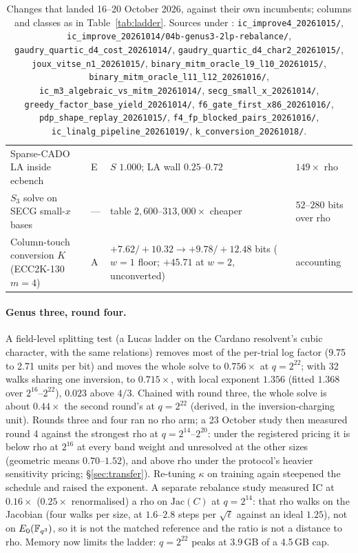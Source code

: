 \begin{table}[p]
\begin{tabularx}{\linewidth}{@{}>{\raggedright}Xl>{\raggedright}p{3.6cm}>{\raggedright\arraybackslash}p{3.2cm}@{}}
Sparse-CADO LA inside ecbench & E & $S$ $1.000$; LA wall $0.25$--$0.72$ & $149\times$ rho \\
$S_3$ solve on SECG small-$x$ bases & --- & table $2{,}600$--$313{,}000\times$ cheaper & $52$--$280$ bits over rho \\
Column-touch conversion $K$ (ECC2K-130 $m=4$) & A & $+7.62/+10.32\to+9.78/+12.48$ bits ($w=1$ floor; $+45.71$ at $w=2$, unconverted) & accounting \\
\bottomrule
\end{tabularx}
\caption[]{Changes that landed 16--20 October 2026, against their own
incumbents; columns and classes as in Table~\ref{tab:ladder}. Sources under
: \texttt{ic\_improve4\_20261015/},
\texttt{ic\_improve\_20261014/04b-genus3-2lp-rebalance/},
\texttt{gaudry\_quartic\_d4\_cost\_20261014/},
\texttt{gaudry\_quartic\_d4\_char2\_20261015/},
\texttt{joux\_vitse\_n1\_20261015/}, \texttt{binary\_mitm\_oracle\_l9\_l10\_20261015/},
\texttt{binary\_mitm\_oracle\_l11\_l12\_20261016/},
\texttt{ic\_m3\_algebraic\_vs\_mitm\_20261014/}, \texttt{secg\_small\_x\_20261014/},
\texttt{greedy\_factor\_base\_yield\_20261014/}, \texttt{f6\_gate\_first\_x86\_20261016/},
\texttt{pdp\_shape\_replay\_20261015/}, \texttt{f4\_fp\_blocked\_pairs\_20261016/},
\texttt{ic\_linalg\_pipeline\_20261019/}, \texttt{k\_conversion\_20261018/}.}
\label{tab:ladder2}
\end{table}

\paragraph{Genus three, round four.} A field-level splitting test (a Lucas
ladder on the Cardano resolvent's cubic character, with the same relations)
removes most of the per-trial log factor (9.75 to 2.71 units per bit) and
moves the whole solve to $0.756\times$ at $q=2^{22}$; with 32 walks sharing
one inversion, to $0.715\times$, with local exponent $1.356$ (fitted
$1.368$ over $2^{16}$--$2^{22}$), $0.023$ above $4/3$. Chained with round
three, the whole solve is about $0.44\times$ the second round's at
$q=2^{22}$ (derived, in the inversion-charging unit). Rounds three and four
ran no rho arm; a 23 October study then measured round 4 against the
strongest rho at $q=2^{14}$--$2^{20}$: under the registered pricing it is
below rho at $2^{16}$ at every band weight and unresolved at the other
sizes (geometric means $0.70$--$1.52$), and above rho under the protocol's
heavier sensitivity pricing; \S\ref{sec:transfer}). Re-tuning $\kappa$ on training again steepened the schedule
and raised the exponent. A separate rebalance study measured IC at
$0.16\times$ ($0.25\times$ renormalised) a rho on $\mathrm{Jac}(C)$ at
$q=2^{14}$: that rho walks on the Jacobian (four walks per size, at
$1.6$--$2.8$ steps per $\sqrt\ell$ against an ideal $1.25$), not on
$E_0(\mathbb{F}_{q^3})$, so it is not the matched reference and the ratio is not
a distance to rho.
Memory now limits the ladder: $q=2^{22}$ peaks at 3.9\,GB of a 4.5\,GB cap.

